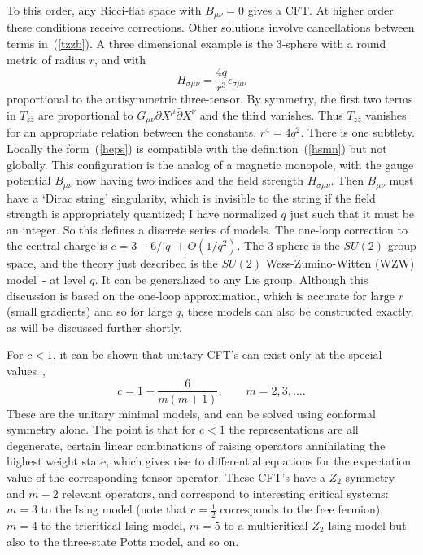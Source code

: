 To this order, any Ricci-flat space with $B_{\mu\nu} = 0$
gives a CFT.  At higher order these conditions receive corrections.
Other solutions involve cancellations between terms in~(\ref{tzzb}).
A three dimensional example is the 3-sphere with a
round metric of radius $r$, and with
\begin{equation}
H_{\sigma\mu\nu} = \frac{4q}{r^3} \epsilon_{\sigma\mu\nu} 
\label{heps}
\end{equation} 
proportional to the antisymmetric three-tensor.
By symmetry, the first two terms in $T_{z\bar z}$ are proportional
to $G_{\mu\nu}\partial X^\mu \bar\partial X^\nu$ and the third
vanishes.  Thus $T_{z\bar z}$ vanishes for an
appropriate relation between the constants, $r^4 = 4 q^2$.
There is one subtlety.  Locally the form~(\ref{heps}) is compatible
with the definition~(\ref{hsmn}) but not globally.  This
configuration is the analog of a magnetic monopole, with the gauge
potential $B_{\mu\nu}$ now having two indices and the field strength
$H_{\sigma\mu\nu}$.  Then $B_{\mu\nu}$ must have a `Dirac string'
singularity, which is invisible to the string if the field strength
is appropriately quantized; I have normalized $q$ just such that it
must be an integer.  So this defines a discrete
series of models.  The one-loop correction to the central charge is $c
= 3 - 6/|q| + O(1/q^2)$.  The 3-sphere is the $SU(2)$ group space, and
the theory just described is the $SU(2)$ Wess-Zumino-Witten (WZW)
model~\cite{Wwzw}-\cite{GepW} at level $q$.  It can be generalized to
any Lie group. Although this discussion
is based on the one-loop approximation, which is accurate for 
large $r$ (small gradients) and so for large $q$, these
models can also be constructed exactly, as will be discussed
further shortly.

For $c < 1$, it can be shown that unitary CFT's can exist only
at the special values~\cite{BPZ},~\cite{FQS}
\begin{equation}
c = 1 - \frac{6}{m(m+1)}, \qquad m = 2,3, \ldots.
\end{equation}
These are the unitary minimal models, and can be solved using
conformal symmetry alone.  The point is that for $c<1$ the
representations are all degenerate, certain linear combinations of
raising operators annihilating the highest weight state, which gives
rise to differential equations for the expectation value of the
corresponding tensor operator.  These CFT's have a $Z_2$ symmetry
and $m-2$ relevant operators, and correspond to interesting critical
systems: $m = 3$ to the Ising model (note that $c = \frac{1}{2}$ 
corresponds to the free fermion), $m = 4$ to the tricritical Ising
model, $m=5$ to a multicritical $Z_2$ Ising model but also to the 
three-state Potts model, and so on.

